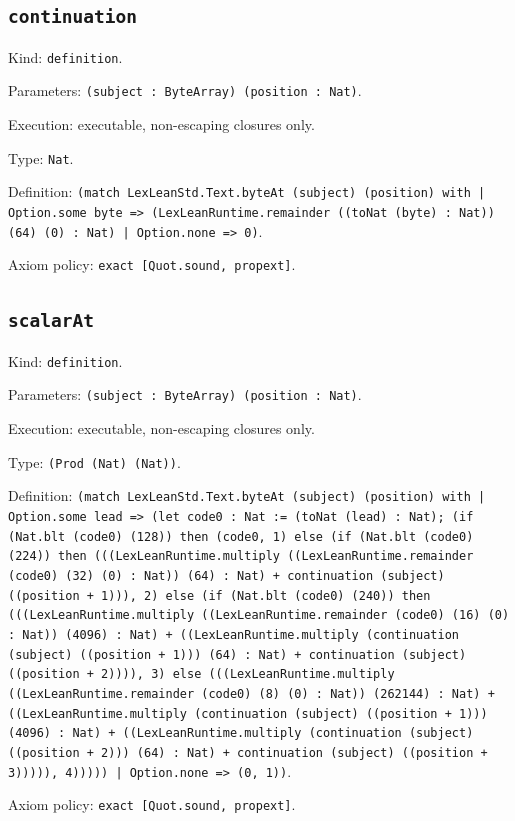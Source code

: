 \documentclass[11pt]{article}
\begin{document}
\subsection*{\texttt{continuation}}
\noindent Kind: \texttt{definition}.\par
\noindent Parameters: \texttt{(subject : ByteArray) (position : Nat)}.\par
\noindent Execution: executable, non-escaping closures only.\par
\noindent Type: \texttt{Nat}.\par
\noindent Definition: \texttt{(match LexLeanStd.Text.byteAt (subject) (position) with | Option.some byte => (LexLeanRuntime.remainder ((toNat (byte) : Nat)) (64) (0) : Nat) | Option.none => 0)}.\par
\noindent Axiom policy: \texttt{exact [Quot.sound, propext]}.\par
\subsection*{\texttt{scalarAt}}
\noindent Kind: \texttt{definition}.\par
\noindent Parameters: \texttt{(subject : ByteArray) (position : Nat)}.\par
\noindent Execution: executable, non-escaping closures only.\par
\noindent Type: \texttt{(Prod (Nat) (Nat))}.\par
\noindent Definition: \texttt{(match LexLeanStd.Text.byteAt (subject) (position) with | Option.some lead => (let code0 : Nat := (toNat (lead) : Nat); (if (Nat.blt (code0) (128)) then (code0, 1) else (if (Nat.blt (code0) (224)) then (((LexLeanRuntime.multiply ((LexLeanRuntime.remainder (code0) (32) (0) : Nat)) (64) : Nat) + continuation (subject) ((position + 1))), 2) else (if (Nat.blt (code0) (240)) then (((LexLeanRuntime.multiply ((LexLeanRuntime.remainder (code0) (16) (0) : Nat)) (4096) : Nat) + ((LexLeanRuntime.multiply (continuation (subject) ((position + 1))) (64) : Nat) + continuation (subject) ((position + 2)))), 3) else (((LexLeanRuntime.multiply ((LexLeanRuntime.remainder (code0) (8) (0) : Nat)) (262144) : Nat) + ((LexLeanRuntime.multiply (continuation (subject) ((position + 1))) (4096) : Nat) + ((LexLeanRuntime.multiply (continuation (subject) ((position + 2))) (64) : Nat) + continuation (subject) ((position + 3))))), 4))))) | Option.none => (0, 1))}.\par
\noindent Axiom policy: \texttt{exact [Quot.sound, propext]}.\par
\end{document}
